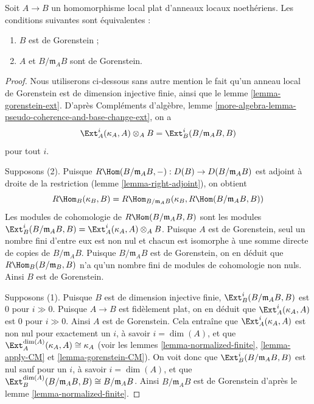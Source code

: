 \begin{lemma}
\label{lemma-flat-under-gorenstein}
Soit $A \to B$ un homomorphisme local plat d'anneaux locaux noethériens.
Les conditions suivantes sont équivalentes :
\begin{enumerate}
\item $B$ est de Gorenstein ;
\item $A$ et $B/\mathfrak m_A B$ sont de Gorenstein.
\end{enumerate}
\end{lemma}

\begin{proof}
Nous utiliserons ci-dessous sans autre mention le fait qu'un anneau local
de Gorenstein est de dimension injective finie, ainsi que le lemme \ref{lemma-gorenstein-ext}.
D'après Compléments d'algèbre, lemme \ref{more-algebra-lemma-pseudo-coherence-and-base-change-ext}, on a
$$
\Ext^i_A(\kappa_A, A) \otimes_A B =
\Ext^i_B(B/\mathfrak m_A B, B)
$$
pour tout $i$.

\medskip\noindent
Supposons (2). Puisque $R\Hom(B/\mathfrak m_A B, -) : D(B) \to D(B/\mathfrak m_A B)$ est adjoint à droite de la restriction
(lemme \ref{lemma-right-adjoint}), on obtient
$$
R\Hom_B(\kappa_B, B) =
R\Hom_{B/\mathfrak m_A B}(\kappa_B, R\Hom(B/\mathfrak m_A B, B))
$$
Les modules de cohomologie de $R\Hom(B/\mathfrak m_A B, B)$ sont les modules $\Ext^i_B(B/\mathfrak m_A B, B) =
\Ext^i_A(\kappa_A, A) \otimes_A B$.
Puisque $A$ est de Gorenstein, seul un nombre fini d'entre eux est non nul
et chacun est isomorphe à une somme directe de copies de $B/\mathfrak m_A B$.
Puisque $B/\mathfrak m_A B$ est de Gorenstein, on en déduit que $R\Hom_B(B/\mathfrak m_B, B)$
n'a qu'un nombre fini de modules de cohomologie non nuls.
Ainsi $B$ est de Gorenstein.

\medskip\noindent
Supposons (1). Puisque $B$ est de dimension injective finie,
$\Ext^i_B(B/\mathfrak m_A B, B)$ est $0$ pour $i \gg 0$.
Puisque $A \to B$ est fidèlement plat, on en déduit que $\Ext^i_A(\kappa_A, A)$ est $0$ pour $i \gg 0$.
Ainsi $A$ est de Gorenstein. Cela entraîne que $\Ext^i_A(\kappa_A, A)$ est non nul
pour exactement un $i$, à savoir $i = \dim(A)$, et que $\Ext^{\dim(A)}_A(\kappa_A, A) \cong \kappa_A$
(voir les lemmes \ref{lemma-normalized-finite}, \ref{lemma-apply-CM} et \ref{lemma-gorenstein-CM}).
On voit donc que $\Ext^i_B(B/\mathfrak m_A B, B)$ est nul sauf pour un $i$,
à savoir $i = \dim(A)$, et que $\Ext^{\dim(A)}_B(B/\mathfrak m_A B, B) \cong B/\mathfrak m_A B$.
Ainsi $B/\mathfrak m_A B$ est de Gorenstein d'après le lemme \ref{lemma-normalized-finite}.
\end{proof}

